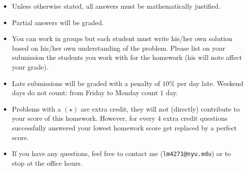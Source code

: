 \centerline{}
{\small
	\begin{itemize}
		\item Unless otherwise stated, all answers must be mathematically justified.
		\item Partial answers will be graded. 
		\item You can work in groups but each student must write his/her own solution based on his/her own understanding of the problem. Please list on your submission the students you work with for the homework (his will note affect your grade).
		\item Late submissions will be graded with a penalty of $10\%$ per day late. Weekend days do not count: from Friday to Monday count $1$ day.
		\item Problems with a $(\star)$ are extra credit, they will not (directly) contribute to your score of this homework. However, for every $4$ extra credit questions successfully answered your lowest homework score get replaced by a perfect score.
		\item If you have any questions, feel free to contact me (\texttt{lm4271@nyu.edu}) or to stop at the office hours.
	\end{itemize}
}
\vspace{-0.4cm}
\centerline{}
\vspace{0.5cm}
